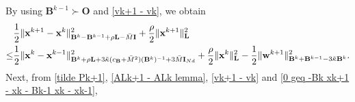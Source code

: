 \documentclass[12pt,draftcls,onecolumn]{IEEEtran}
\begin{document}
By using $\mathbf{B}^{k-1}\succ \mathbf{O}$ and \eqref{vk+1 - vk}, we obtain
\begin{align}
	&\frac{1}{2}\|\mathbf{x}^{k+1} - \mathbf{x}^{k}\|^2_{\mathbf{B}^k-\mathbf{B}^{k-1}+\rho \mathbf{L}-\bar{M}\mathbf{I}}+\frac{\rho}{2}\|\mathbf{x}^{k+1}\|^2_{\mathbf{L}}\notag\\
	\leq& \frac{1}{2}\|\mathbf{x}^{k} - \mathbf{x}^{k-1}\|^2_{\mathbf{B}^k+\rho \mathbf{L}+3\tilde{\kappa}(c_{\mathbf{B}}+\bar{M}^2)(\mathbf{B}^k)^{-1}+3\bar{M}\mathbf{I}_{Nd}} + \frac{\rho}{2}\|\mathbf{x}^k\|^2_\mathbf{L}-\frac{1}{2}\|\mathbf{w}^{k+1}\|^2_{\mathbf{B}^k+\mathbf{B}^{k-1}-3\tilde{\kappa}\mathbf{B}^k}.\label{0 geq -Bk xk+1 - xk - Bk-1 xk - xk-1}
\end{align}
Next, from \eqref{tilde Pk+1}, \eqref{ALk+1 - ALk lemma}, \eqref{vk+1 - vk} and \eqref{0 geq -Bk xk+1 - xk - Bk-1 xk - xk-1},
\end{document}
